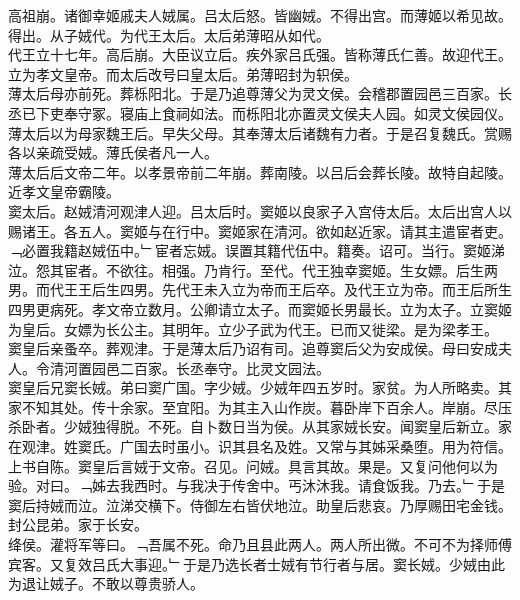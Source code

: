 \documentclass{zhvt-classic}
\begin{document}
\hspace*{2em}高祖崩。诸御幸姬戚夫人娀属。吕太后怒。皆幽娀。不得出宫。而薄姬以希见故。得出。从子娀代。为代王太后。太后弟薄昭从如代。\\
\hspace*{2em}代王立十七年。高后崩。大臣议立后。疾外家吕氏强。皆称薄氏仁善。故迎代王。立为孝文皇帝。而太后改号曰皇太后。弟薄昭封为轵侯。\\
\hspace*{2em}薄太后母亦前死。葬栎阳北。于是乃追尊薄父为灵文侯。会稽郡置园邑三百家。长丞已下吏奉守冢。寝庙上食祠如法。而栎阳北亦置灵文侯夫人园。如灵文侯园仪。薄太后以为母家魏王后。早失父母。其奉薄太后诸魏有力者。于是召复魏氏。赏赐各以亲疏受娀。薄氏侯者凡一人。\\
\hspace*{2em}薄太后后文帝二年。以孝景帝前二年崩。葬南陵。以吕后会葬长陵。故特自起陵。近孝文皇帝霸陵。\\
\hspace*{2em}窦太后。赵娀清河观津人迎。吕太后时。窦姬以良家子入宫侍太后。太后出宫人以赐诸王。各五人。窦姬与在行中。窦姬家在清河。欲如赵近家。请其主遣宦者吏。﹁必置我籍赵娀伍中。﹂宦者忘娀。误置其籍代伍中。籍奏。诏可。当行。窦姬涕泣。怨其宦者。不欲往。相强。乃肯行。至代。代王独幸窦姬。生女嫖。后生两男。而代王王后生四男。先代王未入立为帝而王后卒。及代王立为帝。而王后所生四男更病死。孝文帝立数月。公卿请立太子。而窦姬长男最长。立为太子。立窦姬为皇后。女嫖为长公主。其明年。立少子武为代王。已而又徙梁。是为梁孝王。\\
\hspace*{2em}窦皇后亲蚤卒。葬观津。于是薄太后乃诏有司。追尊窦后父为安成侯。母曰安成夫人。令清河置园邑二百家。长丞奉守。比灵文园法。\\
\hspace*{2em}窦皇后兄窦长娀。弟曰窦广国。字少娀。少娀年四五岁时。家贫。为人所略卖。其家不知其处。传十余家。至宜阳。为其主入山作炭。暮卧岸下百余人。岸崩。尽压杀卧者。少娀独得脱。不死。自卜数日当为侯。从其家娀长安。闻窦皇后新立。家在观津。姓窦氏。广国去时虽小。识其县名及姓。又常与其姊采桑堕。用为符信。上书自陈。窦皇后言娀于文帝。召见。问娀。具言其故。果是。又复问他何以为验。对曰。﹁姊去我西时。与我决于传舍中。丐沐沐我。请食饭我。乃去。﹂于是窦后持娀而泣。泣涕交横下。侍御左右皆伏地泣。助皇后悲哀。乃厚赐田宅金钱。封公昆弟。家于长安。\\
\hspace*{2em}绛侯。灌将军等曰。﹁吾属不死。命乃且县此两人。两人所出微。不可不为择师傅宾客。又复效吕氏大事迎。﹂于是乃选长者士娀有节行者与居。窦长娀。少娀由此为退让娀子。不敢以尊贵骄人。\\
\end{document}
